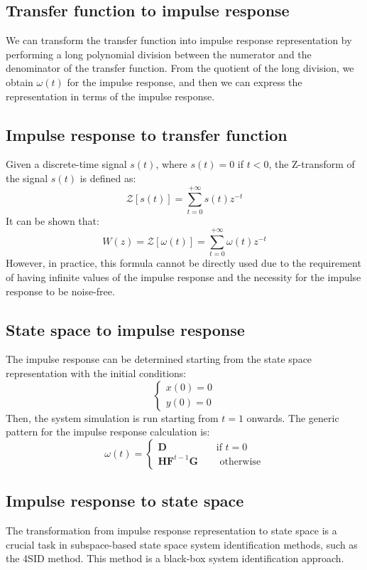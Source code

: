 \subsection{Transfer function to impulse response}
We can transform the transfer function into impulse response representation by performing a long polynomial division between the numerator and the denominator of the transfer function.
From the quotient of the long division, we obtain $\omega(t)$ for the impulse response, and then we can express the representation in terms of the impulse response. 

\subsection{Impulse response to transfer function}
Given a discrete-time signal $s(t)$, where $s(t)=0$ if $t<0$, the Z-transform of the signal $s(t)$ is defined as: 
\[\mathcal{Z}[s(t)]=\sum_{t=0}^{+\infty}s(t)z^{-t}\]
It can be shown that:
\[W(z)=\mathcal{Z}[\omega(t)]=\sum_{t=0}^{+\infty}\omega(t)z^{-t}\]
However, in practice, this formula cannot be directly used due to the requirement of having infinite values of the impulse response and the necessity for the impulse response to be noise-free.

\subsection{State space to impulse response}
The impulse response can be determined starting from the state space representation with the initial conditions:
\[\begin{cases}
    x(0)=0 \\
    y(0)=0
\end{cases}\]
Then, the system simulation is run starting from $t=1$ onwards. 
The generic pattern for the impulse response calculation is:
\[\omega(t)=\begin{cases}
    \mathbf{D} \qquad\qquad\quad\text{if } t=0 \\
    \mathbf{HF}^{t-1} \mathbf{G}   \qquad \, \text{otherwise}
\end{cases}\]

\subsection{Impulse response to state space}
The transformation from impulse response representation to state space is a crucial task in subspace-based state space system identification methods, such as the 4SID method. 
This method is a black-box system identification approach.
